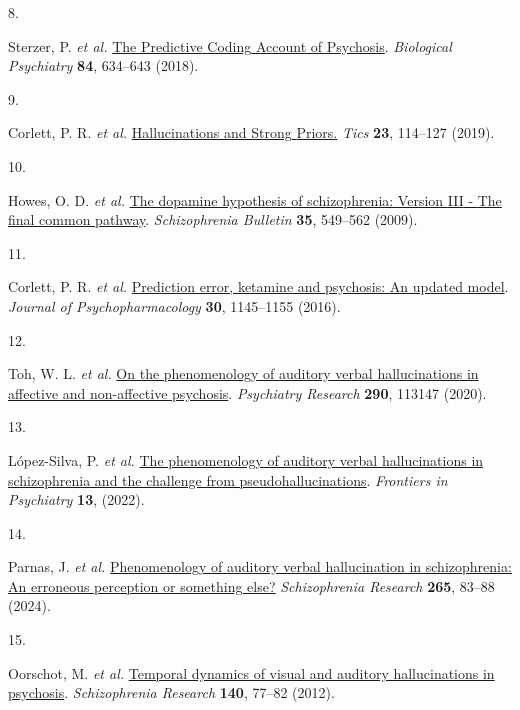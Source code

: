 \documentclass[
]{article}
\newlength{\cslhangindent}
\newlength{\csllabelwidth}
\newlength{\cslentryspacingunit} %
\newenvironment{CSLReferences}[2] %
 {%
  \setlength{\parindent}{0pt}
  \ifodd #1
  \let\oldpar\par
  \def\par{\hangindent=\cslhangindent\oldpar}
  \fi
  \setlength{\parskip}{#2\cslentryspacingunit}
 }%
 {}
\newcommand{\CSLLeftMargin}[1]{\parbox[t]{\csllabelwidth}{#1}}
\newcommand{\CSLRightInline}[1]{\parbox[t]{\linewidth - \csllabelwidth}{#1}\break}
\begin{document}
\begin{CSLReferences}{0}{0}
\leavevmode{}%
\CSLLeftMargin{8. }%
\CSLRightInline{Sterzer, P. \emph{et al.}
\href{https://doi.org/10.1016/j.biopsych.2018.05.015}{The {Predictive}
{Coding} {Account} of {Psychosis}}. \emph{Biological Psychiatry}
\textbf{84}, 634--643 (2018).}

\leavevmode{}%
\CSLLeftMargin{9. }%
\CSLRightInline{Corlett, P. R. \emph{et al.}
\href{https://doi.org/10.1016/j.tics.2018.12.001}{Hallucinations and
{Strong} {Priors}.} \emph{Tics} \textbf{23}, 114--127 (2019).}

\leavevmode{}%
\CSLLeftMargin{10. }%
\CSLRightInline{Howes, O. D. \emph{et al.}
\href{https://doi.org/10.1093/schbul/sbp006}{The dopamine hypothesis of
schizophrenia: {Version} {III} - {The} final common pathway}.
\emph{Schizophrenia Bulletin} \textbf{35}, 549--562 (2009).}

\leavevmode{}%
\CSLLeftMargin{11. }%
\CSLRightInline{Corlett, P. R. \emph{et al.}
\href{https://doi.org/10.1177/0269881116650087}{Prediction error,
ketamine and psychosis: {An} updated model}. \emph{Journal of
Psychopharmacology} \textbf{30}, 1145--1155 (2016).}

\leavevmode{}%
\CSLLeftMargin{12. }%
\CSLRightInline{Toh, W. L. \emph{et al.}
\href{https://doi.org/10.1016/j.psychres.2020.113147}{On the
phenomenology of auditory verbal hallucinations in affective and
non-affective psychosis}. \emph{Psychiatry Research} \textbf{290},
113147 (2020).}

\leavevmode{}%
\CSLLeftMargin{13. }%
\CSLRightInline{López-Silva, P. \emph{et al.}
\href{https://doi.org/10.3389/fpsyt.2022.826654}{The phenomenology of
auditory verbal hallucinations in schizophrenia and the challenge from
pseudohallucinations}. \emph{Frontiers in Psychiatry} \textbf{13},
(2022).}

\leavevmode{}%
\CSLLeftMargin{14. }%
\CSLRightInline{Parnas, J. \emph{et al.}
\href{https://doi.org/10.1016/j.schres.2023.03.045}{Phenomenology of
auditory verbal hallucination in schizophrenia: {An} erroneous
perception or something else?} \emph{Schizophrenia Research}
\textbf{265}, 83--88 (2024).}

\leavevmode{}%
\CSLLeftMargin{15. }%
\CSLRightInline{Oorschot, M. \emph{et al.}
\href{https://doi.org/10.1016/j.schres.2012.06.010}{Temporal dynamics of
visual and auditory hallucinations in psychosis}. \emph{Schizophrenia
Research} \textbf{140}, 77--82 (2012).}


\end{CSLReferences}
\end{document}

